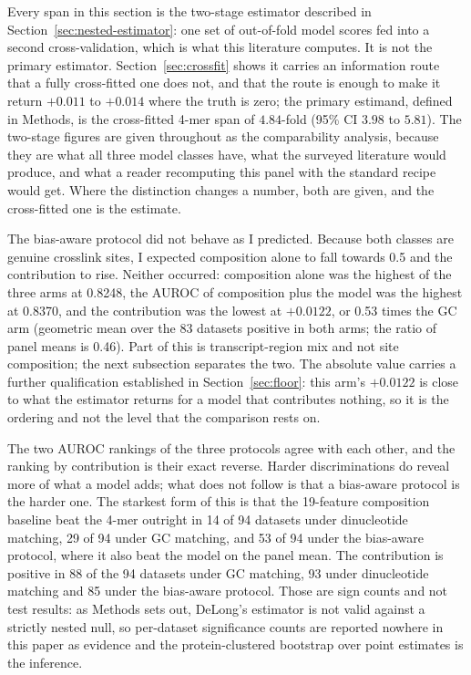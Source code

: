 Every span in this section is the two-stage estimator described in Section~\ref{sec:nested-estimator}:
one set of out-of-fold model scores fed into a second cross-validation, which is what this
literature computes. It is not the primary estimator. Section~\ref{sec:crossfit} shows it
carries an information route that a fully cross-fitted one does not, and that the route is
enough to make it return $+0.011$ to $+0.014$ where the truth is zero; the primary estimand,
defined in Methods, is the cross-fitted 4-mer span of $4.84$-fold (95\% CI $3.98$ to $5.81$).
The two-stage figures are given throughout as the comparability analysis, because they are what
all three model classes have, what the surveyed literature would produce, and what a reader
recomputing this panel with the standard recipe would get. Where the distinction changes a
number, both are given, and the cross-fitted one is the estimate.

The bias-aware protocol did not behave as I predicted. Because both classes are genuine
crosslink sites, I expected composition alone to fall towards 0.5 and the contribution to rise.
Neither occurred: composition alone was the highest of the three arms at 0.8248, the AUROC of
composition plus the model was the highest at 0.8370, and the contribution was the lowest at
$+0.0122$, or 0.53 times the GC arm (geometric mean over the 83 datasets positive in both arms;
the ratio of panel means is 0.46). Part of this is transcript-region mix and not site
composition; the next subsection separates the two. The absolute value carries a further
qualification established in Section~\ref{sec:floor}: this arm's $+0.0122$ is close to what the
estimator returns for a model that contributes nothing, so it is the ordering and not the level
that the comparison rests on.

The two AUROC rankings of the three protocols agree with each other, and the ranking by
contribution is their exact reverse. Harder discriminations do reveal more of what a model adds;
what does not follow is that a bias-aware protocol is the harder one. The starkest form of this
is that the 19-feature composition baseline beat the 4-mer outright in 14 of 94 datasets under
dinucleotide matching, 29 of 94 under GC matching, and 53 of 94 under the bias-aware protocol,
where it also beat the model on the panel mean. The contribution is positive in 88 of the 94 datasets under GC matching, 93 under dinucleotide
matching and 85 under the bias-aware protocol. Those are sign counts and not test results: as
Methods sets out, DeLong's estimator is not valid against a strictly nested null, so per-dataset
significance counts are reported nowhere in this paper as evidence and the protein-clustered
bootstrap over point estimates is the inference.

